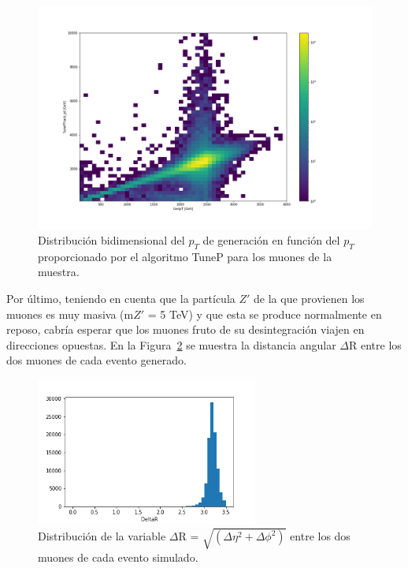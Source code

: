 \begin{figure}[h!]
\centering
\includegraphics[width=1.0\textwidth]{figures/data_tunePpt_genpt.png}
\caption{Distribuci\'on bidimensional del $p_{T}$ de generaci\'on en funci\'on del $p_{T}$ proporcionado por el algoritmo TuneP para los muones de la muestra.}
\label{fig:data_recopt_genpt}  
\end{figure}

Por \'ultimo, teniendo en cuenta que la part\'icula $Z'$ de la que provienen los muones es muy masiva (m$Z'$ = 5 TeV) y que esta se produce normalmente en reposo, cabr\'ia esperar que los muones fruto de su desintegraci\'on viajen en direcciones opuestas. En la Figura~\ref{fig:data_deltaR} se muestra la distancia angular $\Delta$R entre los dos muones de cada evento generado. \\

\begin{figure}[h!]
\centering
\includegraphics[width=0.65\textwidth]{figures/data_deltaR.png}
\caption{Distribuci\'on de la variable $\Delta$R = $\sqrt{(\Delta\eta^{2}+\Delta\phi^{2})}$ entre los dos muones de cada evento simulado.}
\label{fig:data_deltaR}  
\end{figure}

\clearpage


 
